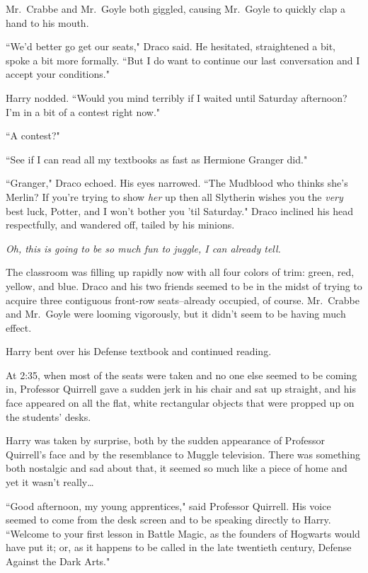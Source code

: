 Mr.~Crabbe and Mr.~Goyle both giggled, causing Mr.~Goyle to quickly clap a hand to his mouth.

``We'd better go get our seats," Draco said. He hesitated, straightened a bit, spoke a bit more formally. ``But I do want to continue our last conversation and I accept your conditions."

Harry nodded. ``Would you mind terribly if I waited until Saturday afternoon? I'm in a bit of a contest right now."

``A contest?"

``See if I can read all my textbooks as fast as Hermione Granger did."

``Granger," Draco echoed. His eyes narrowed. ``The Mudblood who thinks she's Merlin? If you're trying to show \emph{her} up then all Slytherin wishes you the \emph{very} best luck, Potter, and I won't bother you 'til Saturday." Draco inclined his head respectfully, and wandered off, tailed by his minions.

\emph{Oh, this is going to be \emph{so} much fun to juggle, I can already tell.}

The classroom was filling up rapidly now with all four colors of trim: green, red, yellow, and blue. Draco and his two friends seemed to be in the midst of trying to acquire three contiguous front-row seats\---already occupied, of course. Mr.~Crabbe and Mr.~Goyle were looming vigorously, but it didn't seem to be having much effect.

Harry bent over his Defense textbook and continued reading.

\later

At 2:35\pm, when most of the seats were taken and no one else seemed to be coming in, Professor Quirrell gave a sudden jerk in his chair and sat up straight, and his face appeared on all the flat, white rectangular objects that were propped up on the students' desks.

Harry was taken by surprise, both by the sudden appearance of Professor Quirrell's face and by the resemblance to Muggle television. There was something both nostalgic and sad about that, it seemed so much like a piece of home and yet it wasn't really{\ldots}

``Good afternoon, my young apprentices," said Professor Quirrell. His voice seemed to come from the desk screen and to be speaking directly to Harry. ``Welcome to your first lesson in Battle Magic, as the founders of Hogwarts would have put it; or, as it happens to be called in the late twentieth century, Defense Against the Dark Arts."

